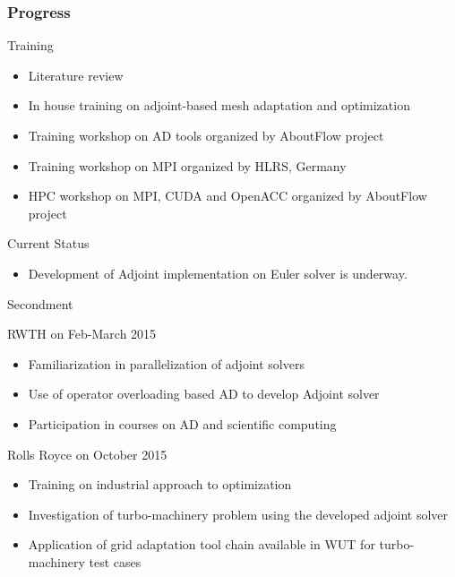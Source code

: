 \begin{frame}
\frametitle{Progress}
	\begin{block}{Training}
		\begin{itemize}
			\item Literature review
			\item In house training on adjoint-based mesh adaptation and optimization
			\item Training workshop on AD tools organized by AboutFlow project
			\item Training workshop on MPI organized by HLRS, Germany
			\item HPC workshop on MPI, CUDA and OpenACC organized by AboutFlow project
		\end{itemize}
	\end{block}
	\begin{block}{Current Status}
		\begin{itemize}
			\item Development of Adjoint implementation on Euler solver is underway.
		\end{itemize}	
	\end{block}
\end{frame}

\begin{frame}{Secondment}

\begin{block}{RWTH on Feb-March 2015}
\begin{itemize}
\item Familiarization in parallelization of adjoint solvers
\item Use of operator overloading based AD to develop Adjoint solver 
\item Participation in courses on AD and scientific computing
\end{itemize}
\end{block}
\begin{block}{Rolls Royce on October 2015}
\begin{itemize}
\item Training on industrial approach to optimization
\item Investigation of turbo-machinery problem using the developed adjoint solver 
\item Application of grid adaptation tool chain available in WUT for turbo-machinery test cases
\end{itemize}
\end{block}
\end{frame}

